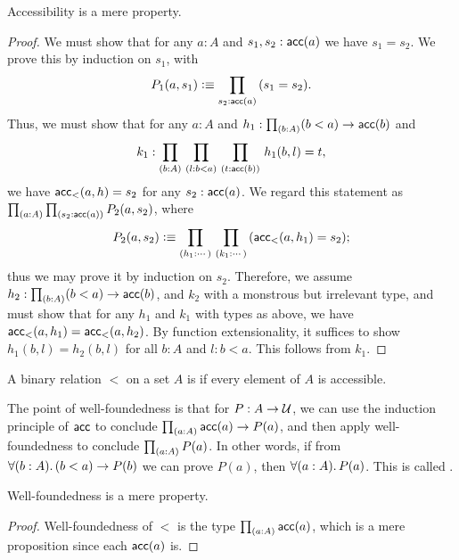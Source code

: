 \begin{lem}
  Accessibility is a mere property.
\end{lem}
\begin{proof}
  We must show that for any $a:A$ and $s_1,s_2:\mathsf{acc}(a)$ we have $s_1=s_2$.
  We prove this by induction on $s_1$, with
  \[P_1(a,s_1) \defeq \prd{s_2:\acc(a)} (s_1=s_2). \]
  Thus, we must show that for any $a:A$ and ${h_1:\prd{b:A} (b<a) \to \acc(b)}$ and
  \[ k_1:{\prd{b:A}{l:b<a}{t:\acc(b)} h_1(b,l) = t},\]
  we have $\mathsf{acc}_<(a,h) = s_2$ for any $s_2:\mathsf{acc}(a)$.
  We regard this statement as $\prd{a:A}{s_2:\acc(a)} P_2(a,s_2)$, where
  \[P_2(a,s_2) \defeq
  \prd{h_1 : \cdots } %
  {k_1 : \cdots} %
  (\acc_<(a,h_1) = s_2);
  \]
  thus we may prove it by induction on $s_2$.
  Therefore, we assume $h_2 : \prd{b:A} (b<a) \to \acc(b)$, and $k_2$ with a monstrous but irrelevant type,
  and must show that for any $h_1$ and $k_1$ with types as above,
  we have $\mathsf{acc}_<(a,h_1) = \mathsf{acc}_<(a,h_2)$.
  By function extensionality, it suffices to show $h_1(b,l) = h_2(b,l)$ for all $b:A$ and $l:b<a$.
  This follows from $k_1$.
\end{proof}

\begin{defn}
  A binary relation $<$ on a set $A$ is 
  if every element of $A$ is accessible.
\end{defn}

The point of well-foundedness is that for $P:A\to \mathcal{U}$, we can use the induction principle of $\mathsf{acc}$ to conclude $\prd{a:A} \acc(a) \to P(a)$, and then apply well-foundedness to conclude $\prd{a:A} P(a)$.
In other words, if from $\fall{b:A} (b<a) \to P(b)$ we can prove $P(a)$, then $\fall{a:A} P(a)$.
This is called .

\begin{lem}
  Well-foundedness is a mere property.
\end{lem}
\begin{proof}
  Well-foundedness of $<$ is the type $\prd{a:A} \acc(a)$, which is a mere proposition since each $\mathsf{acc}(a)$ is.
\end{proof}

